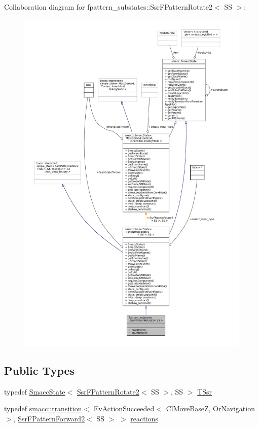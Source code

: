 Collaboration diagram for fpattern\+\_\+substates\+:\+:Ssr\+F\+Pattern\+Rotate2$<$ SS $>$\+:
\nopagebreak
\begin{figure}[H]
\begin{center}
\leavevmode
\includegraphics[width=350pt]{structfpattern__substates_1_1SsrFPatternRotate2__coll__graph}
\end{center}
\end{figure}
\subsection*{Public Types}
\begin{DoxyCompactItemize}
\item 
typedef \hyperlink{classSmaccState}{Smacc\+State}$<$ \hyperlink{structfpattern__substates_1_1SsrFPatternRotate2}{Ssr\+F\+Pattern\+Rotate2}$<$ SS $>$, SS $>$ \hyperlink{structfpattern__substates_1_1SsrFPatternRotate2_aec44e099cf2e57b8cd9c6f2ee2562e4a}{T\+Ssr}
\item 
typedef \hyperlink{classsmacc_1_1transition}{smacc\+::transition}$<$ Ev\+Action\+Succeeded$<$ Cl\+Move\+BaseZ, Or\+Navigation $>$, \hyperlink{structfpattern__substates_1_1SsrFPatternForward2}{Ssr\+F\+Pattern\+Forward2}$<$ SS $>$ $>$ \hyperlink{structfpattern__substates_1_1SsrFPatternRotate2_a479f6de95a3970fad0f25c865abacaa6}{reactions}
\end{DoxyCompactItemize}

